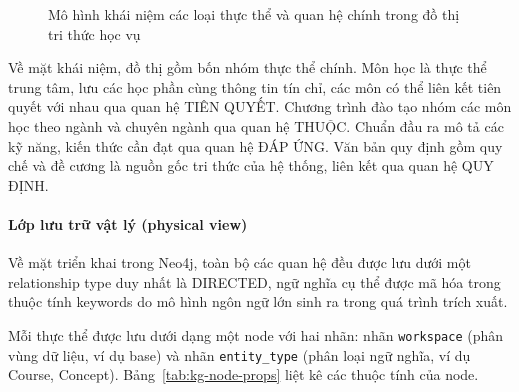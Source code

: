 \begin{figure}[H]
\caption{Mô hình khái niệm các loại thực thể và quan hệ chính trong đồ thị tri thức học vụ}
\label{fig:kg-concept-model}
\end{figure}

Về mặt khái niệm, đồ thị gồm bốn nhóm thực thể chính. Môn học là thực thể trung tâm, lưu các học phần cùng thông tin tín chỉ, các môn có thể liên kết tiên quyết với nhau qua quan hệ TIÊN QUYẾT. Chương trình đào tạo nhóm các môn học theo ngành và chuyên ngành qua quan hệ THUỘC. Chuẩn đầu ra mô tả các kỹ năng, kiến thức cần đạt qua quan hệ ĐÁP ỨNG. Văn bản quy định gồm quy chế và đề cương là nguồn gốc tri thức của hệ thống, liên kết qua quan hệ QUY ĐỊNH.

\paragraph{Lớp lưu trữ vật lý (physical view)}
Về mặt triển khai trong Neo4j, toàn bộ các quan hệ đều được lưu dưới một relationship type duy nhất là DIRECTED, ngữ nghĩa cụ thể được mã hóa trong thuộc tính keywords do mô hình ngôn ngữ lớn sinh ra trong quá trình trích xuất.

Mỗi thực thể được lưu dưới dạng một node với hai nhãn: nhãn \texttt{workspace} (phân vùng dữ liệu, ví dụ base) và nhãn \texttt{entity\_type} (phân loại ngữ nghĩa, ví dụ Course, Concept). Bảng~\ref{tab:kg-node-props} liệt kê các thuộc tính của node.

